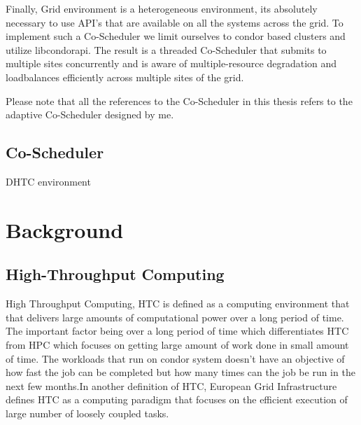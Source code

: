 \documentclass[ms,electronic,double]{nuthesis}
\begin{document}
Finally, Grid environment is a heterogeneous environment, its absolutely necessary
to use API's that are available on all the systems across the grid. To implement such a Co-Scheduler
 we limit ourselves to condor based clusters and utilize libcondorapi. The result is a threaded Co-Scheduler 
that submits to multiple sites concurrently and is aware of multiple-resource degradation and
loadbalances efficiently across multiple sites of the grid. 

Please note that all the references to the Co-Scheduler in this thesis refers to the adaptive Co-Scheduler designed 
by me.  
\section{Co-Scheduler}

DHTC environment


\chapter{Background}

\section{High-Throughput Computing} High Throughput Computing, HTC is defined as 
a computing environment that that delivers large amounts of computational
power over a long period of time.  The important factor being over a long period of time which 
differentiates HTC from HPC which focuses on getting large amount of work done in small amount of time.
The workloads that run on condor system doesn't have an objective of  how fast the job can be completed 
but how many times can the job be run in the next few months.In another definition of HTC, European Grid  
Infrastructure defines HTC as a computing paradigm that focuses on the efficient 
execution of large number of loosely coupled tasks.
\end{document}
